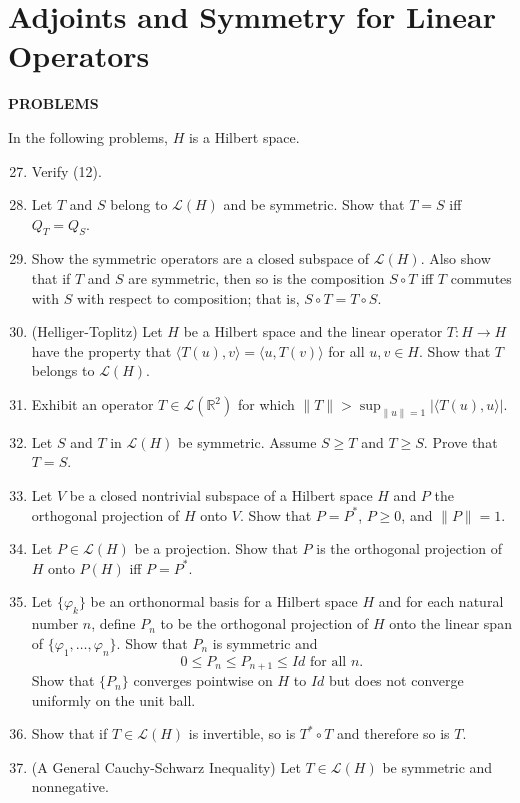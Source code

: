 \section{Adjoints and Symmetry for Linear Operators}
\begin{center}
	\textbf{PROBLEMS}
\end{center}
In the following problems, $H$ is a Hilbert space.
\begin{enumerate}
	\setcounter{enumi}{26}
    \item Verify (12).
    \item Let $T$ and $S$ belong to $\mathcal{L}(H)$ and be symmetric. 
    Show that $T=S$ iff $Q_T=Q_S$.
    \item Show the symmetric operators are a closed subspace of $\mathcal{L}(H)$.
    Also show that if $T$ and $S$ are symmetric, then so is the composition $S\circ T$ iff $T$ commutes with $S$ with respect to composition; that is, $S\circ T=T\circ S$.
    \item (Helliger-Toplitz) Let $H$ be a Hilbert space and the linear operator $T:H\to H$ have the property that $\langle T(u),v\rangle=\langle u,T(v)\rangle$ for all $u,v\in H$.
    Show that $T$ belongs to $\mathcal{L}(H)$.
    \item Exhibit an operator $T\in\mathcal{L}(\mathbb{R}^2)$ for which $\|T\|>\sup_{\|u\|=1}|\langle T(u),u\rangle|$.
    \item Let $S$ and $T$ in $\mathcal{L}(H)$ be symmetric.
    Assume $S\ge T$ and $T\ge S$.
    Prove that $T=S$.
    \item Let $V$ be a closed nontrivial subspace of a Hilbert space $H$ and $P$ the orthogonal projection of $H$ onto $V$.
    Show that $P=P^*$, $P\ge0$, and $\|P\|=1$.
    \item Let $P\in\mathcal{L}(H)$ be a projection.
    Show that $P$ is the orthogonal projection of $H$ onto $P(H)$ iff $P=P^*$.
    \item Let $\{\varphi_k\}$ be an orthonormal basis for a Hilbert space $H$ and for each natural number $n$, define $P_n$ to be the orthogonal projection of $H$ onto the linear span of $\{\varphi_1,\dots,\varphi_n\}$.
    Show that $P_n$ is symmetric and 
    \[
        0\le P_n\le P_{n+1}\le Id\text{ for all }n.
    \]
    Show that $\{P_n\}$ converges pointwise on $H$ to $Id$ but does not converge uniformly on the unit ball.
    \item Show that if $T\in\mathcal{L}(H)$ is invertible, so is $T^*\circ T$ and therefore so is $T$.
    \item (A General Cauchy-Schwarz Inequality) Let $T\in\mathcal{L}(H)$ be symmetric and nonnegative.

\end{enumerate}
